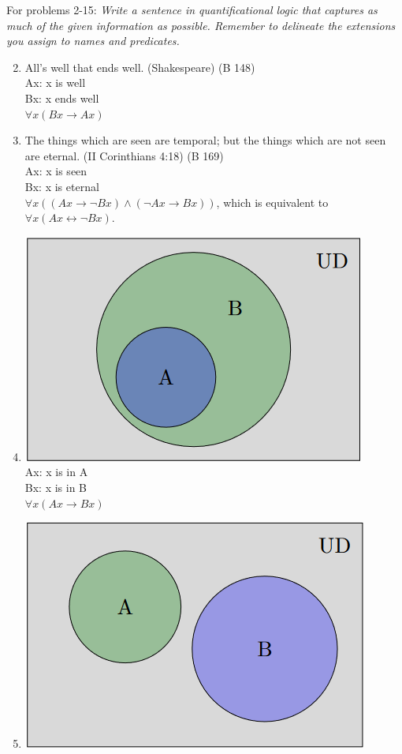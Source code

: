 \documentclass{article}
\begin{document}
\begin{flushleft}
    For problems 2-15: \textit{Write a sentence in quantificational logic that captures as much of the given information as possible. Remember to delineate the extensions you assign to names and predicates.}
\end{flushleft}
\begin{enumerate}
    \setcounter{enumi}{1}
    \item All's well that ends well. (Shakespeare) (B 148)\\
          Ax: x is well\\
          Bx: x ends well\\
          $\forall x(Bx \to Ax)$
    \item The things which are seen are temporal; but the things which are not seen are eternal. (II Corinthians 4:18) (B 169)\\
          Ax: x is seen\\
          Bx: x is eternal\\
          $\forall x((Ax \to \neg Bx) \land (\neg Ax \to Bx))$, which is equivalent to $\forall x (Ax \leftrightarrow \neg Bx)$.
    \item \includegraphics{2.1.4} \\
          Ax: x is in A\\
          Bx: x is in B\\
          $\forall x(Ax \to Bx)$
    \item \includegraphics{2.1.5}\\

\end{enumerate}
\end{document}
